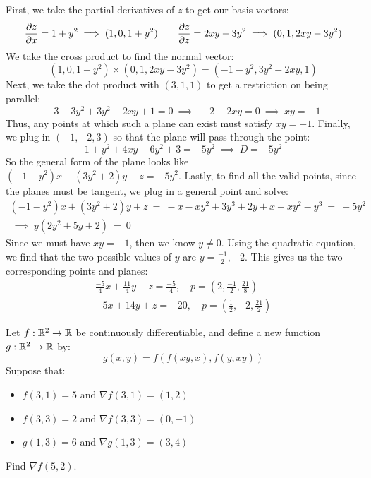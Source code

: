 \begin{soln}
    First, we take the partial derivatives of $ z $ to get our basis vectors:
    \begin{equation*}
        \frac{\partial z}{\partial x} = 1+y^{2} \implies (1, 0, 1+y^{2}) \qquad
        \frac{\partial z}{\partial z} = 2xy-3y^{2} \implies (0, 1, 2xy-3y^{2})
    \end{equation*}
    We take the cross product to find the normal vector:
    \begin{equation*}
        (1,0,1+y^{2})\times(0,1,2xy-3y^{2})=(-1-y^{2},3y^{2}-2xy,1)
    \end{equation*}
    Next, we take the dot product with $ (3,1,1) $ to get a restriction on being
    parallel:
    \begin{equation*}
        -3-3y^{2}+3y^{2}-2xy+1=0 \ \implies \ -2-2xy=0 \ \implies \ xy=-1
    \end{equation*}
    Thus, any points at which such a plane can exist must satisfy $ xy=-1 $.
    Finally, we plug in $ (-1,-2,3) $ so that the plane will pass through the
    point:
    \begin{equation*}
        1+y^{2}+4xy-6y^{2}+3=-5y^{2} \ \implies \ D = -5y^{2}
    \end{equation*}
    So the general form of the plane looks like $ (-1-y^{2})x+(3y^{2}+2)y+z=
    -5y^{2} $. Lastly, to find all the valid points, since the planes must be
    tangent, we plug in a general point and solve:
    \begin{gather*}
        (-1-y^{2})x+(3y^{2}+2)y+z \ = \ -x-xy^{2}+3y^{3}+2y+x+xy^{2}-y^{3}
        \ = \ -5y^{2} \\
        \ \implies \ y(2y^{2}+5y+2) \ = \ 0
    \end{gather*}
    Since we must have $ xy=-1 $, then we know $ y\neq0 $. Using the quadratic
    equation, we find that the two possible values of $ y $ are
    $ y=\frac{-1}{2},-2 $. This gives us the two corresponding points and planes:
    \begin{gather*}
        \frac{-5}{4}x+\frac{11}{4}y+z=\frac{-5}{4}, \quad
        p=\left(2,\frac{-1}{2},\frac{21}{8}\right) \\
        -5x+14y+z=-20, \quad p=\left(\frac{1}{2},-2,\frac{21}{2}\right)
    \end{gather*}
\end{soln}

\newpage
\begin{qu}[num=29.3]
    Let $ f : \mathbb{R}^{2} \rightarrow \mathbb{R} $ be continuously differentiable, and
    define a new function $ g:\mathbb{R}^{2}\rightarrow\mathbb{R} $ by:
    \begin{equation*}
        g(x,y) = f(f(xy,x),f(y,xy))
    \end{equation*}
    Suppose that:
    \begin{itemize}
        \item $ f(3,1) = 5 $ and $ \nabla f(3,1) = (1, 2) $
        \item $ f(3,3) = 2 $ and $ \nabla f(3,3) = (0, -1) $
        \item $ g(1,3) = 6 $ and $ \nabla g(1,3) = (3, 4) $
    \end{itemize}
    Find $ \nabla f(5, 2) $.
\end{qu}

